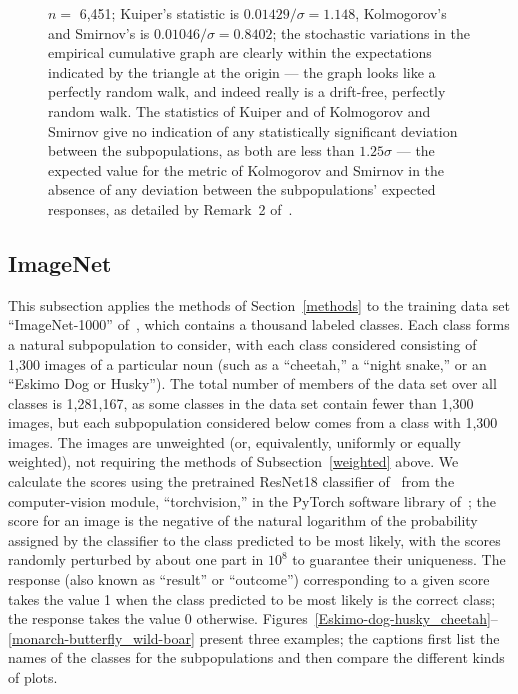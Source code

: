 \documentclass{article}
\begin{document}
\begin{figure}
\begin{centering}
\end{centering}
\caption{$n =$ 6,451; Kuiper's statistic is $0.01429 / \sigma = 1.148$,
         Kolmogorov's and Smirnov's is $0.01046 / \sigma = 0.8402$;
         the stochastic variations in the empirical cumulative graph
         are clearly within the expectations indicated by the triangle
         at the origin --- the graph looks like a perfectly random walk,
         and indeed really is a drift-free, perfectly random walk.
         The statistics of Kuiper and of Kolmogorov and Smirnov
         give no indication of any statistically significant deviation
         between the subpopulations, as both are less than $1.25 \sigma$ ---
         the expected value for the metric of Kolmogorov and Smirnov
         in the absence of any deviation between the subpopulations'
         expected responses, as detailed by Remark~2 of~\cite{tygert}.
}
\label{ex3}
\end{figure}


\clearpage


\subsection{ImageNet}
\label{imagenetex}

This subsection applies the methods of Section~\ref{methods}
to the training data set ``ImageNet-1000'' of~\cite{imagenet},
which contains a thousand labeled classes.
Each class forms a natural subpopulation to consider,
with each class considered consisting of 1,300 images of a particular noun
(such as a ``cheetah,'' a ``night snake,'' or an ``Eskimo Dog or Husky'').
The total number of members of the data set over all classes is 1,281,167,
as some classes in the data set contain fewer than 1,300 images,
but each subpopulation considered below comes from a class with 1,300 images.
The images are unweighted (or, equivalently, uniformly or equally weighted),
not requiring the methods of Subsection~\ref{weighted} above.
We calculate the scores using the pretrained ResNet18 classifier
of~\cite{he-zhang-ren-sun} from the computer-vision module, ``torchvision,''
in the PyTorch software library of~\cite{pytorch};
the score for an image is the negative of the natural logarithm
of the probability assigned by the classifier
to the class predicted to be most likely,
with the scores randomly perturbed by about one part in $10^8$ to guarantee
their uniqueness.
The response (also known as ``result'' or ``outcome'') corresponding
to a given score takes the value 1 when the class predicted to be most likely
is the correct class; the response takes the value 0 otherwise.
Figures~\ref{Eskimo-dog-husky_cheetah}--\ref{monarch-butterfly_wild-boar}
present three examples; the captions first list the names of the classes
for the subpopulations and then compare the different kinds of plots.
\end{document}
